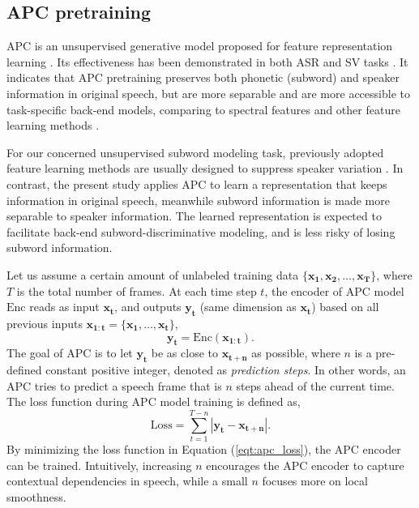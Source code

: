 \documentclass[a4paper]{article}
\begin{document}
\subsection{APC pretraining}
APC is an unsupervised generative model proposed for feature representation learning \cite{Chung2019}. 
Its effectiveness has been demonstrated in both ASR and SV tasks \cite{Chung2019}. It indicates that APC pretraining preserves both phonetic (subword) and speaker information in original speech,  but are more  separable and are more accessible to task-specific back-end models, comparing to spectral features and other feature learning methods \cite{Chung2019}. 

For our concerned unsupervised subword modeling task, previously adopted feature learning methods 
are usually designed to suppress speaker variation \cite{Feng2019improving,heck2017feature}. In contrast, the present study applies APC to learn a representation that keeps information in original speech, meanwhile subword information is made more separable to speaker information. The learned representation is expected to facilitate back-end subword-discriminative modeling, and is less risky of losing subword information.



Let us assume a certain amount of unlabeled training data $\{\bm{x_1}, \bm{x_2}, \ldots, \bm{x_T}\}$, where $T$ is the total number of frames. At each time step $t$, the encoder of APC model $\textrm{Enc}$ reads as input
$\bm{x_t}$, 
and outputs $\bm{y_t}$ (same dimension as $\bm{x_t}$) based on all previous inputs $\bm{x_{1:t}}=\{\bm{x_1},\ldots,\bm{x_t}\}$,
\begin{equation}
    \bm{y_t} = \textrm{Enc} (\bm{x_{1:t}}).
    \label{eqt:enc}
\end{equation}
The goal of APC is to let $\bm{y_t}$ be as close to $\bm{x_{t+n}}$ as possible, where $n$ is a pre-defined constant positive integer, denoted as \textit{prediction steps}. In other words, an APC tries to predict a speech frame that is $n$ steps ahead of the current time. The loss function during APC model training is defined as,
\begin{equation}
    \textrm{Loss} = \sum_{t=1}^{T-n} \left| \bm{y_t} - \bm{x_{t+n}} \right|.
    \label{eqt:apc_loss}
\end{equation}
By minimizing the loss function in Equation (\ref{eqt:apc_loss}), the APC encoder can be trained. Intuitively, increasing $n$ encourages the APC encoder to capture contextual dependencies in speech, 
while a small $n$ focuses more on local smoothness.
 
\end{document}

